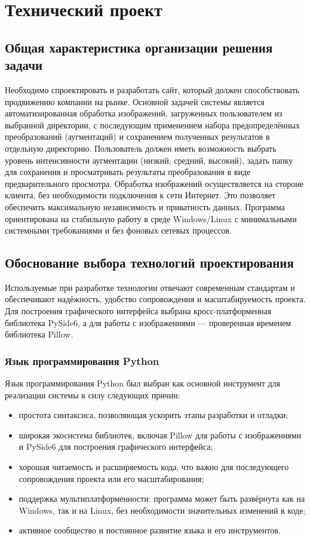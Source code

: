 \section{Технический проект}
\subsection{Общая характеристика организации решения задачи}

Необходимо спроектировать и разработать сайт, который должен способствовать продвижению компании на рынке.
Основной задачей системы является автоматизированная обработка изображений, загруженных пользователем из выбранной директории, с последующим применением набора предопределённых преобразований (аугментаций) и сохранением полученных результатов в отдельную директорию. Пользователь должен иметь возможность выбрать уровень интенсивности аугментации (низкий, средний, высокий), задать папку для сохранения и просматривать результаты преобразования в виде предварительного просмотра.
Обработка изображений осуществляется на стороне клиента, без необходимости подключения к сети Интернет. Это позволяет обеспечить максимальную независимость и приватность данных. Программа ориентирована на стабильную работу в среде Windows/Linux с минимальными системными требованиями и без фоновых сетевых процессов.

\subsection{Обоснование выбора технологий проектирования}

Используемые при разработке технологии отвечают современным стандартам и обеспечивают надёжность, удобство сопровождения и масштабируемость проекта. Для построения графического интерфейса выбрана кросс-платформенная библиотека PySide6, а для работы с изображениями — проверенная временем библиотека Pillow.

\subsubsection{Язык программирования Python}

Язык программирования Python был выбран как основной инструмент для реализации системы в силу следующих причин:

\begin{itemize}
	\item простота синтаксиса, позволяющая ускорить этапы разработки и отладки;
	\item широкая экосистема библиотек, включая Pillow для работы с изображениями и PySide6 для построения графического интерфейса;
	\item хорошая читаемость и расширяемость кода, что важно для последующего сопровождения проекта или его масштабирования;
	\item поддержка мультиплатформенности: программа может быть развёрнута как на Windows, так и на Linux, без необходимости значительных изменений в коде;
	\item активное сообщество и постоянное развитие языка и его инструментов.
\end{itemize}

